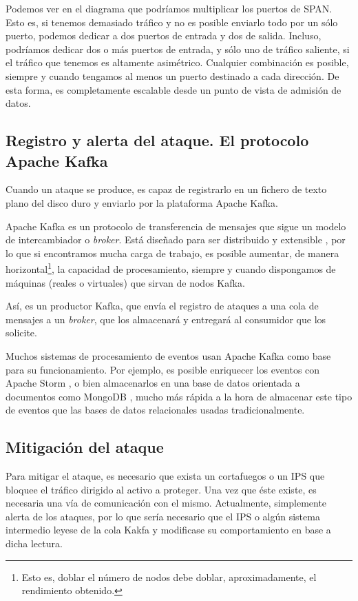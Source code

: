 Podemos ver en el diagrama que podríamos multiplicar los puertos de SPAN. Esto es, si tenemos demasiado tráfico y no es 
posible enviarlo todo por un sólo puerto, podemos dedicar a \redborderddos{} dos puertos de entrada y dos de salida. 
Incluso, podríamos dedicar dos o más puertos de entrada, y sólo uno de tráfico saliente, si el tráfico que tenemos es 
altamente asimétrico. Cualquier combinación es posible, siempre y cuando tengamos al menos un puerto destinado a cada 
dirección. De esta forma, \redborderddos{} es completamente escalable desde un punto de vista de admisión de datos.

\subsection{Registro y alerta del ataque. El protocolo Apache Kafka}
Cuando un ataque se produce, \redborderddos{} es capaz de registrarlo en un fichero de texto plano del disco duro y 
enviarlo por la plataforma Apache Kafka.

Apache Kafka es un protocolo de transferencia de mensajes que sigue un modelo de intercambiador o 
\emph{broker}. Está diseñado para ser distribuido y extensible \cite{ApacheKafka}, por lo que si 
encontramos mucha carga de trabajo, es posible aumentar, de manera horizontal\footnote{Esto es, doblar el número de 
nodos debe doblar, aproximadamente, el rendimiento obtenido.}, la capacidad de procesamiento, siempre y cuando 
dispongamos de máquinas (reales o virtuales) que sirvan de nodos Kafka.

Así, \redborderddos{} es un productor Kafka, que envía el registro de ataques a una cola de 
mensajes a un \emph{broker}, que los almacenará y entregará al consumidor que los solicite.

Muchos sistemas de procesamiento de eventos usan Apache Kafka como base para su funcionamiento. Por ejemplo, es posible 
enriquecer los eventos con Apache Storm \cite{ApacheStorm}, o bien almacenarlos en una base de 
datos orientada a documentos como MongoDB \cite{MongoDB}, mucho más rápida a la hora de almacenar este 
tipo de eventos que las bases de datos relacionales usadas tradicionalmente.

\subsection{Mitigación del ataque}
Para mitigar el ataque, es necesario que exista un cortafuegos o un \gls{IPS} que bloquee el tráfico dirigido al activo a proteger. Una vez que éste existe, es necesaria una vía 
de comunicación con el mismo. Actualmente, \redborderddos{} simplemente alerta de los ataques, por lo que sería 
necesario que el \gls{IPS} o algún sistema intermedio leyese de la cola Kakfa y modificase su comportamiento en base a 
dicha lectura.

